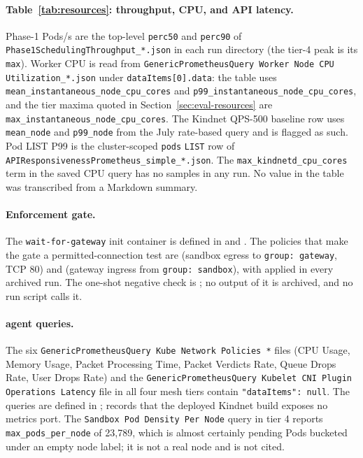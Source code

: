 \paragraph{Table~\ref{tab:resources}: throughput, CPU, and API latency.}
Phase-1 Pods/s are the top-level \texttt{perc50} and \texttt{perc90} of
\texttt{Phase1SchedulingThroughput\_*.json} in each run directory (the
tier-4 peak is its \texttt{max}). Worker CPU is read from
\texttt{GenericPrometheusQuery Worker Node CPU Utilization\_*.json}
under \texttt{dataItems[0].data}: the table uses
\texttt{mean\_instantaneous\_node\_cpu\_cores} and
\texttt{p99\_instantaneous\_node\_cpu\_cores}, and the tier maxima
quoted in Section~\ref{sec:eval-resources} are
\texttt{max\_instantaneous\_node\_cpu\_cores}. The
Kindnet QPS-500 baseline row uses \texttt{mean\_node} and
\texttt{p99\_node} from the July rate-based query and is flagged as
such. Pod LIST P99 is the cluster-scoped \texttt{pods} \texttt{LIST} row
of \texttt{APIResponsivenessPrometheus\_simple\_*.json}. The
\texttt{max\_kindnetd\_cpu\_cores} term in the saved CPU query has no
samples in any run. No value in the table was transcribed from a
Markdown summary.

\paragraph{Enforcement gate.}
The \texttt{wait-for-gateway} init container is defined in
 and
. The policies that make the gate a
permitted-connection test are  (sandbox
egress to \texttt{group: gateway}, TCP 80) and
 (gateway ingress from \texttt{group:
sandbox}), with  applied in every archived
run. The one-shot negative check is ; no
output of it is archived, and no run script calls it.

\paragraph{\sys{} agent queries.}
The six \texttt{GenericPrometheusQuery Kube Network Policies *} files
(CPU Usage, Memory Usage, Packet Processing Time, Packet Verdicts Rate,
Queue Drops Rate, User Drops Rate) and the
\texttt{GenericPrometheusQuery Kubelet CNI Plugin Operations Latency}
file in all four \sys{} mesh tiers contain \texttt{"dataItems": null}.
The queries are defined in
;
 records that the deployed Kindnet
build exposes no metrics port. The \texttt{Sandbox Pod Density Per Node}
query in tier 4 reports \texttt{max\_pods\_per\_node} of 23,789, which is
almost certainly pending Pods bucketed under an empty node label; it is
not a real node and is not cited.

